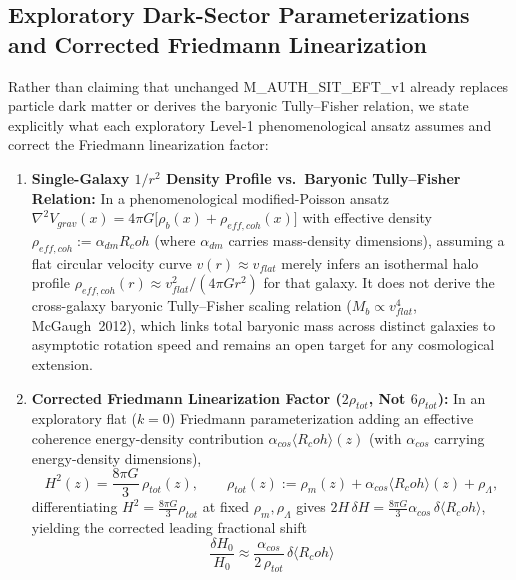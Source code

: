 \documentclass[american,11pt,letterpaper]{article}
\newcommand{\Rcoh}{R_{\mathrm{coh}}}
\def\mathbf#1{#1}%
\def\mathrm#1{#1}%
\def\texttt#1{#1}%
\def\emph#1{#1}%
\def\Rcoh{R_coh}%
\begin{document}
\subsection{Exploratory Dark-Sector Parameterizations and Corrected Friedmann Linearization}
\label{sec:darkmatter}

Rather than claiming that unchanged \texttt{M\_AUTH\_SIT\_EFT\_v1} already replaces particle dark matter or derives the baryonic Tully--Fisher relation, we state explicitly what each exploratory Level-1 phenomenological ansatz assumes and correct the Friedmann linearization factor:
\begin{enumerate}[leftmargin=2em]
  \item \textbf{Single-Galaxy $1/r^2$ Density Profile vs.\ Baryonic Tully--Fisher Relation:} In a phenomenological modified-Poisson ansatz $\nabla^2 V_{\mathrm{grav}}(\mathbf{x}) = 4\pi G\bigl[\rho_b(\mathbf{x}) + \rho_{\mathrm{eff,coh}}(\mathbf{x})\bigr]$ with effective density $\rho_{\mathrm{eff,coh}} := \alpha_{\mathrm{dm}}\Rcoh$ (where $\alpha_{\mathrm{dm}}$ carries mass-density dimensions), assuming a flat circular velocity curve $v(r) \approx v_{\mathrm{flat}}$ merely infers an isothermal halo profile $\rho_{\mathrm{eff,coh}}(r) \approx v_{\mathrm{flat}}^2/(4\pi G r^2)$ for that galaxy. It does \emph{not} derive the cross-galaxy baryonic Tully--Fisher scaling relation ($M_b \propto v_{\mathrm{flat}}^4$, McGaugh~2012), which links total baryonic mass across distinct galaxies to asymptotic rotation speed and remains an open target for any cosmological extension.
  \item \textbf{Corrected Friedmann Linearization Factor ($2\rho_{\mathrm{tot}}$, Not $6\rho_{\mathrm{tot}}$):} In an exploratory flat ($k = 0$) Friedmann parameterization adding an effective coherence energy-density contribution $\alpha_{\mathrm{cos}}\langle\Rcoh\rangle(z)$ (with $\alpha_{\mathrm{cos}}$ carrying energy-density dimensions),
  \begin{equation}
  H^2(z) = \frac{8\pi G}{3}\,\rho_{\mathrm{tot}}(z),
  \qquad
  \rho_{\mathrm{tot}}(z) := \rho_m(z) + \alpha_{\mathrm{cos}}\langle\Rcoh\rangle(z) + \rho_\Lambda,
  \label{eq:friedmann_exploratory}
  \end{equation}
  differentiating $H^2 = \frac{8\pi G}{3}\rho_{\mathrm{tot}}$ at fixed $\rho_m, \rho_\Lambda$ gives $2H\,\delta H = \frac{8\pi G}{3}\alpha_{\mathrm{cos}}\,\delta\langle\Rcoh\rangle$, yielding the corrected leading fractional shift
  \begin{equation}
  \frac{\delta H_0}{H_0} \approx \frac{\alpha_{\mathrm{cos}}}{2\,\rho_{\mathrm{tot}}}\,\delta\langle\Rcoh\rangle

\end{equation}
\end{enumerate}
\end{document}
